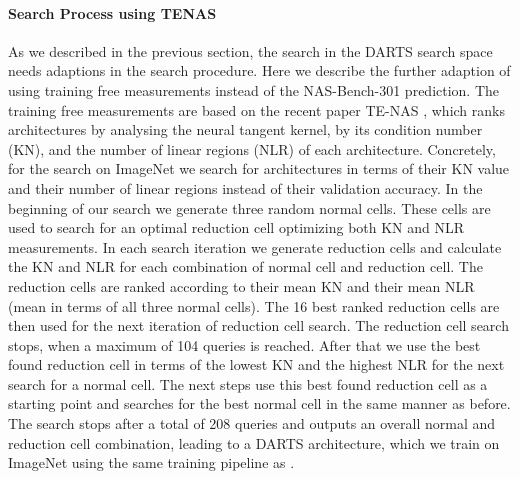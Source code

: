 \documentclass[runningheads]{llncs}
\begin{document}
\paragraph{Search Process using TENAS}
As we described in the previous section, the search in the DARTS \cite{2018DARTS} search space needs adaptions in the search procedure.
Here we describe the further adaption of using training free measurements instead of the NAS-Bench-301 prediction.
The training free measurements are based on the recent paper TE-NAS \cite{2021Im4GPU}, which ranks architectures by analysing the neural tangent kernel, by its condition number (KN), and the number of linear regions (NLR) of each architecture. 
Concretely, for the search on ImageNet \cite{2009ImageNet} we search for architectures in terms of their KN value and their number of linear regions instead of their validation accuracy.
In the beginning of our search we generate three random normal cells.
These cells are used to search for an optimal reduction cell optimizing both KN and NLR measurements.
In each search iteration we generate reduction cells and calculate the KN and NLR for each combination of normal cell and reduction cell.
The reduction cells are ranked according to their mean KN and their mean NLR (mean in terms of all three normal cells).
The 16 best ranked reduction cells are then used for the next iteration of reduction cell search.
The reduction cell search stops, when a maximum of 104 queries is reached.
After that we use the best found reduction cell in terms of the lowest KN and the highest NLR for the next search for a normal cell.
The next steps use this best found reduction cell as a starting point and searches for the best normal cell in the same manner as before. 
The search stops after a total of 208 queries and outputs an overall normal and reduction cell combination, leading to a DARTS \cite{2018DARTS} architecture, which we train on ImageNet \cite{2009ImageNet} using the same training pipeline as \cite{2021Im4GPU}.
\end{document}
